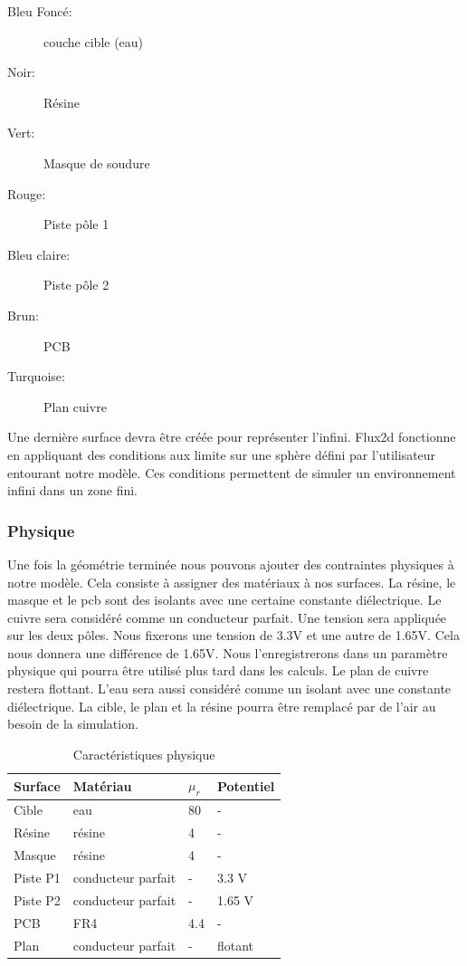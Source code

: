 \begin{description}
 \item[Bleu Foncé:] couche cible (eau)
 \item[Noir:] Résine
 \item[Vert:] Masque de soudure
 \item[Rouge:] Piste pôle 1
 \item[Bleu claire:] Piste pôle 2
 \item[Brun:] PCB
 \item[Turquoise:] Plan cuivre
\end{description}

Une dernière surface devra être créée pour représenter l'infini. Flux2d fonctionne en appliquant des conditions aux limite sur une sphère défini par l'utilisateur entourant notre modèle. Ces conditions permettent de simuler un environnement infini dans un zone fini. 

\subsubsection{Physique}
Une fois la géométrie terminée nous pouvons ajouter des contraintes physiques à notre modèle. Cela consiste à assigner des matériaux à nos surfaces. La résine, le masque et le pcb sont des isolants avec une certaine constante diélectrique. Le cuivre sera considéré comme un conducteur parfait. Une tension sera appliquée sur les deux pôles. Nous fixerons une tension de 3.3V et une autre de 1.65V. Cela nous donnera une différence de 1.65V. Nous l’enregistrerons dans un paramètre physique qui pourra être utilisé plus tard dans les calculs. Le plan de cuivre restera flottant. L'eau sera aussi considéré comme un isolant avec une constante diélectrique. La cible, le plan et la résine pourra être remplacé par de l'air au besoin de la simulation.


\begin{table}[!ht]
 \begin{center}
\begin{tabular}{|l|l|l|l|}
\hline
Surface & Matériau & $\mu_r$ & Potentiel\\
\hline
Cible & eau & 80 & -\\
\hline
Résine & résine & 4 & -\\
\hline
Masque & résine & 4 & -\\
\hline
Piste P1 & conducteur parfait & - & 3.3 V\\
\hline
Piste P2 & conducteur parfait & - & 1.65 V\\
\hline
PCB & FR4 & 4.4 & -\\
\hline
Plan & conducteur parfait & - & flotant\\
\hline
\end{tabular}
\caption{Caractéristiques physique}
\end{center}
\end{table}



